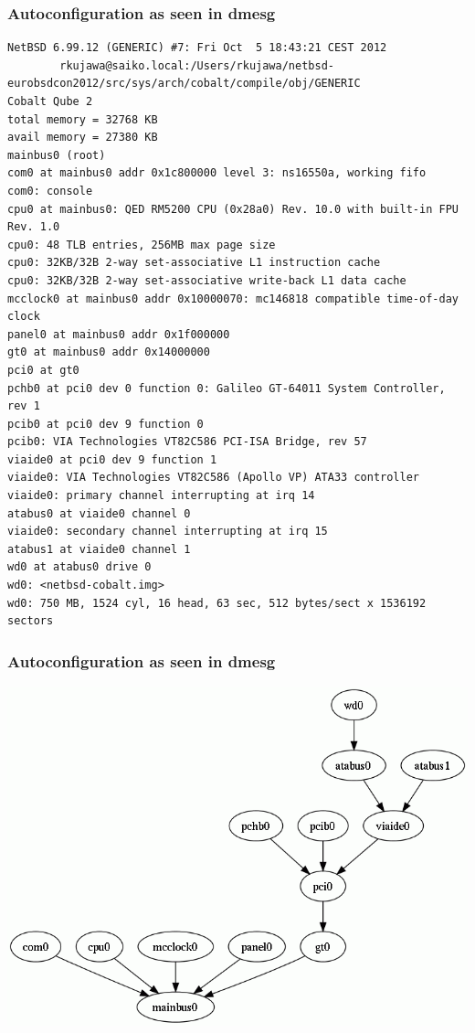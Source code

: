 \documentclass[dvipsnames,table]{beamer}
\begin{document}
\begin{frame}[fragile]
\frametitle{Autoconfiguration as seen in dmesg}
\tiny
\begin{verbatim}
NetBSD 6.99.12 (GENERIC) #7: Fri Oct  5 18:43:21 CEST 2012
        rkujawa@saiko.local:/Users/rkujawa/netbsd-eurobsdcon2012/src/sys/arch/cobalt/compile/obj/GENERIC
Cobalt Qube 2
total memory = 32768 KB
avail memory = 27380 KB
mainbus0 (root)
com0 at mainbus0 addr 0x1c800000 level 3: ns16550a, working fifo
com0: console
cpu0 at mainbus0: QED RM5200 CPU (0x28a0) Rev. 10.0 with built-in FPU Rev. 1.0
cpu0: 48 TLB entries, 256MB max page size
cpu0: 32KB/32B 2-way set-associative L1 instruction cache
cpu0: 32KB/32B 2-way set-associative write-back L1 data cache
mcclock0 at mainbus0 addr 0x10000070: mc146818 compatible time-of-day clock
panel0 at mainbus0 addr 0x1f000000
gt0 at mainbus0 addr 0x14000000
pci0 at gt0
pchb0 at pci0 dev 0 function 0: Galileo GT-64011 System Controller, rev 1
pcib0 at pci0 dev 9 function 0
pcib0: VIA Technologies VT82C586 PCI-ISA Bridge, rev 57
viaide0 at pci0 dev 9 function 1
viaide0: VIA Technologies VT82C586 (Apollo VP) ATA33 controller
viaide0: primary channel interrupting at irq 14
atabus0 at viaide0 channel 0
viaide0: secondary channel interrupting at irq 15
atabus1 at viaide0 channel 1
wd0 at atabus0 drive 0
wd0: <netbsd-cobalt.img>
wd0: 750 MB, 1524 cyl, 16 head, 63 sec, 512 bytes/sect x 1536192 sectors\end{verbatim}
\end{frame}

\begin{frame}
\frametitle{Autoconfiguration as seen in dmesg}
\begin{center}
\includegraphics[scale=0.4]{img_cobaltdevices.png}
\end{center}
\end{frame}
\end{document}
